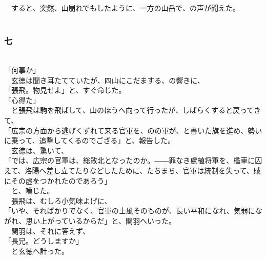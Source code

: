 \documentclass[
  paper=a5,
  fontsize=10pt,
  jafontsize=9.5pt,
  tate,                  %
  open_bracket_pos=nibu, %
]{jlreq}
\begin{document}
　すると、突然、山崩れでもしたように、一方の山岳で、の声が聞えた。\\

\\

\subsubsection{七}

\\


「何事か」\\


　玄徳は聞き耳たてていたが、四山にこだまする、の響きに、\\


「張飛。物見せよ」と、すぐ命じた。\\


「心得た」\\


　と張飛は駒を飛ばして、山のほうへ向って行ったが、しばらくすると戻ってきて、\\


「広宗の方面から逃げくずれて来る官軍を、のの軍が、と書いた旗を進め、勢いに乗って、追撃してくるのでござる」と、報告した。\\


　玄徳は、驚いて、\\


「では、広宗の官軍は、総敗北となったのか。――罪なき盧植将軍を、檻車に囚えて、洛陽へ差し立てたりなどしたために、たちまち、官軍は統制を失って、賊にその虚をつかれたのであろう」\\


　と、嘆じた。\\


　張飛は、むしろ小気味よげに、\\


「いや、そればかりでなく、官軍の士風そのものが、長い平和になれ、気弱にながれ、思い上がっているからだ」と、関羽へいった。\\


　関羽は、それに答えず、\\


「長兄。どうしますか」\\


　と玄徳へ計った。\\
\end{document}
